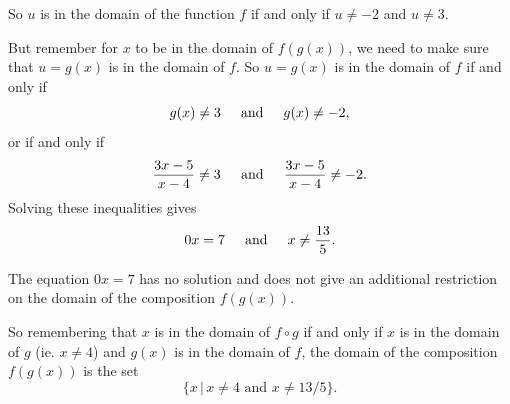 \documentclass{ximera}
\begin{document}
\begin{example}
\begin{explanation}
\begin{enumerate}
So $u$ is in the domain of the function $f$ if and only if $u\neq -2$ and $u\neq 3$.

But remember for $x$ to be in the domain of $f(g(x))$, we need to make sure that $u=g(x)$ is in the domain of $f$. So $u=g(x)$ is in the domain of $f$ if and only if
\[
         g(x) \neq 3 \hskip 0.2 in \text{and} \hskip 0.2in  g(x) \neq -2,
\]
or if and only if
\[
   \frac{3x-5}{x-4} \neq 3 \hskip 0.2 in \text{and} \hskip 0.2in  \frac{3x-5}{x-4} \neq -2.
\]
Solving these inequalities gives
\[
 0x = 7  \hskip 0.2 in \text{and} \hskip 0.2in x\neq \frac{13}{5}.
\]

The equation $0x = 7$ has no solution and does not give an additional restriction on the domain of the composition $f(g(x))$. 

So remembering that $x$ is in the domain of $f\circ g$ if and only if $x$ is in the domain of $g$ (ie. $x\neq 4$) and $g(x)$ is in the domain of $f$, the domain of the composition $f(g(x))$ is the set
\[
 \{ x \, | \, x\neq 4  \text{ and }  x\neq 13/5 \}.
\]

\end{enumerate}
\end{explanation}
\end{example}
\end{document}
